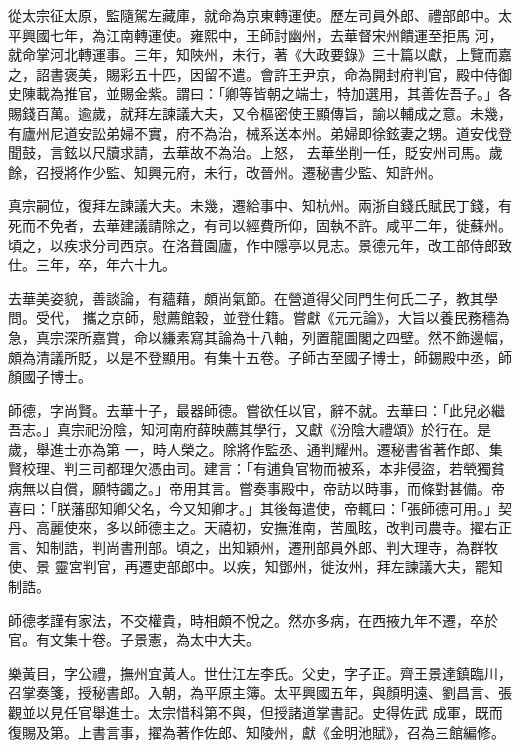 \begin{pinyinscope}
 從太宗征太原，監隨駕左藏庫，就命為京東轉運使。歷左司員外郎、禮部郎中。太平興國七年，為江南轉運使。雍熙中，王師討幽州，去華督宋州饋運至拒馬
 河，就命掌河北轉運事。三年，知陜州，未行，著《大政要錄》三十篇以獻，上覽而嘉之，詔書褒美，賜彩五十匹，因留不遣。會許王尹京，命為開封府判官，殿中侍御史陳載為推官，並賜金紫。謂曰：「卿等皆朝之端士，特加選用，其善佐吾子。」各賜錢百萬。逾歲，就拜左諫議大夫，又令樞密使王顯傳旨，諭以輔成之意。未幾，有廬州尼道安訟弟婦不實，府不為治，械系送本州。弟婦即徐鉉妻之甥。道安伐登聞鼓，言鉉以尺牘求請，去華故不為治。上怒，
 去華坐削一任，貶安州司馬。歲餘，召授將作少監、知興元府，未行，改晉州。遷秘書少監、知許州。



 真宗嗣位，復拜左諫議大夫。未幾，遷給事中、知杭州。兩浙自錢氏賦民丁錢，有死而不免者，去華建議請除之，有司以經費所仰，固執不許。咸平二年，徙蘇州。頃之，以疾求分司西京。在洛葺園廬，作中隱亭以見志。景德元年，改工部侍郎致仕。三年，卒，年六十九。



 去華美姿貌，善談論，有蘊藉，頗尚氣節。在營道得父同門生何氏二子，教其學問。受代，
 攜之京師，慰薦館穀，並登仕籍。嘗獻《元元論》，大旨以養民務穡為急，真宗深所嘉賞，命以縑素寫其論為十八軸，列置龍圖閣之四壁。然不飾邊幅，頗為清議所貶，以是不登顯用。有集十五卷。子師古至國子博士，師錫殿中丞，師顏國子博士。



 師德，字尚賢。去華十子，最器師德。嘗欲任以官，辭不就。去華曰：「此兒必繼吾志。」真宗祀汾陰，知河南府薛映薦其學行，又獻《汾陰大禮頌》於行在。是歲，舉進士亦為第
 一，時人榮之。除將作監丞、通判耀州。遷秘書省著作郎、集賢校理、判三司都理欠憑由司。建言：「有逋負官物而被系，本非侵盜，若煢獨貧病無以自償，願特蠲之。」帝用其言。嘗奏事殿中，帝訪以時事，而條對甚備。帝喜曰：「朕藩邸知卿父名，今又知卿才。」其後每遣使，帝輒曰：「張師德可用。」契丹、高麗使來，多以師德主之。天禧初，安撫淮南，苦風眩，改判司農寺。擢右正言、知制誥，判尚書刑部。頃之，出知穎州，遷刑部員外郎、判大理寺，為群牧使、景
 靈宮判官，再遷吏部郎中。以疾，知鄧州，徙汝州，拜左諫議大夫，罷知制誥。



 師德孝謹有家法，不交權貴，時相頗不悅之。然亦多病，在西掖九年不遷，卒於官。有文集十卷。子景憲，為太中大夫。



 樂黃目，字公禮，撫州宜黃人。世仕江左李氏。父史，字子正。齊王景達鎮臨川，召掌奏箋，授秘書郎。入朝，為平原主簿。太平興國五年，與顏明遠、劉昌言、張觀並以見任官舉進士。太宗惜科第不與，但授諸道掌書記。史得佐武
 成軍，既而復賜及第。上書言事，擢為著作佐郎、知陵州，獻《金明池賦》，召為三館編修。




\end{pinyinscope}

